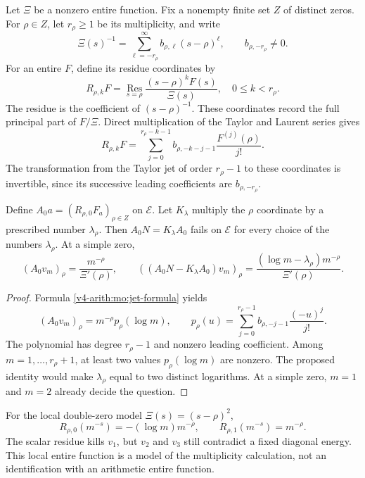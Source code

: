 Let $\Xi$ be a nonzero entire function. Fix a nonempty finite set
$Z$ of distinct zeros. For $\rho\in Z$, let $r_\rho\geq1$ be its
multiplicity, and write
\[
 \Xi(s)^{-1}=
 \sum_{\ell=-r_\rho}^{\infty}b_{\rho,\ell}(s-\rho)^\ell,
 \qquad b_{\rho,-r_\rho}\ne0.
\]
For an entire $F$, define its residue coordinates by
\begin{equation}
 R_{\rho,k}F=\operatorname*{Res}_{s=\rho}
 \frac{(s-\rho)^kF(s)}{\Xi(s)},
 \quad 0\leq k<r_\rho.
 \label{v4-arith:mo:jets}
\end{equation}
The residue is the coefficient of $(s-\rho)^{-1}$. These coordinates
record the full principal part of $F/\Xi$. Direct multiplication
of the Taylor and Laurent series gives
\begin{equation}
 R_{\rho,k}F=
 \sum_{j=0}^{r_\rho-k-1}
 b_{\rho,-k-j-1}\frac{F^{(j)}(\rho)}{j!}.
 \label{v4-arith:mo:jet-formula}
\end{equation}
The transformation from the Taylor jet of order $r_\rho-1$ to
these coordinates is invertible, since its successive leading
coefficients are $b_{\rho,-r_\rho}$.

\begin{proposition}
\label{v4-arith:mo:occupation-defect}
Define $A_0a=(R_{\rho,0}F_a)_{\rho\in Z}$ on $\mathscr E$.
Let $K_\lambda$ multiply the $\rho$ coordinate by a prescribed
number $\lambda_\rho$. Then $A_0N=K_\lambda A_0$ fails on
$\mathscr E$ for every choice of the numbers $\lambda_\rho$.
At a simple zero,
\begin{equation}
 (A_0v_m)_\rho=\frac{m^{-\rho}}{\Xi'(\rho)},\qquad
 ((A_0N-K_\lambda A_0)v_m)_\rho
 =\frac{(\log m-\lambda_\rho)m^{-\rho}}{\Xi'(\rho)}.
 \label{v4-arith:mo:simple-occupation}
\end{equation}
\end{proposition}
\begin{proof}
Formula \eqref{v4-arith:mo:jet-formula} yields
\[
 (A_0v_m)_\rho=m^{-\rho}p_\rho(\log m),\qquad
 p_\rho(u)=\sum_{j=0}^{r_\rho-1}
 b_{\rho,-j-1}\frac{(-u)^j}{j!}.
\]
The polynomial has degree $r_\rho-1$ and nonzero leading
coefficient. Among $m=1,\ldots,r_\rho+1$, at least two values
$p_\rho(\log m)$ are nonzero. The proposed identity would make
$\lambda_\rho$ equal to two distinct logarithms. At a simple zero,
$m=1$ and $m=2$ already decide the question.
\end{proof}

For the local double-zero model $\Xi(s)=(s-\rho)^2$,
\[
 R_{\rho,0}(m^{-s})=-(\log m)m^{-\rho},\qquad
 R_{\rho,1}(m^{-s})=m^{-\rho}.
\]
The scalar residue kills $v_1$, but $v_2$ and $v_3$ still contradict
a fixed diagonal energy. This local entire function is a model
of the multiplicity calculation, not an identification with an
arithmetic entire function.

